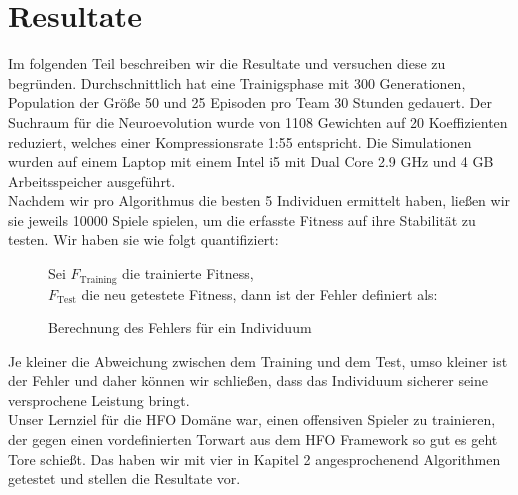 \newpage

\chapter{Resultate}
    Im folgenden Teil beschreiben wir die Resultate und versuchen diese zu begründen. Durchschnittlich hat eine Trainigsphase mit 300 Generationen, Population der Größe 50 und 25 Episoden pro Team 30 Stunden gedauert. Der Suchraum für die Neuroevolution wurde von 1108 Gewichten auf 20 Koeffizienten reduziert, welches einer Kompressionsrate 1:55 entspricht. Die Simulationen wurden auf einem Laptop mit einem Intel i5 mit Dual Core 2.9 GHz und 4 GB Arbeitsspeicher ausgeführt.\\[2mm]
    \noindent
    Nachdem wir pro Algorithmus die besten 5 Individuen ermittelt haben, ließen wir sie jeweils 10000 Spiele spielen, um die erfasste Fitness auf ihre Stabilität zu testen. Wir haben sie wie folgt quantifiziert:\\[2mm]

        \begin{figure}[H]
            \begin{mdframed}
                Sei $F_{\text{Training}}$ die trainierte Fitness, \\
                \hspace*{4mm} $F_{\text{Test}}$ die neu getestete Fitness, dann ist der Fehler definiert als:\\[4mm]
                \hspace*{40mm} 
            \end{mdframed}
            \renewcommand{\figurename}{Definition}
            \caption{Berechnung des Fehlers für ein Individuum}
        \end{figure}

        \noindent
        Je kleiner die Abweichung zwischen dem Training und dem Test, umso kleiner ist der Fehler und daher können wir schließen, dass das Individuum sicherer seine versprochene Leistung bringt.\\

        \noindent
        Unser Lernziel für die HFO Domäne war, einen offensiven Spieler zu trainieren, der gegen einen vordefinierten Torwart aus dem HFO Framework so gut es geht Tore schießt. Das haben wir mit vier in Kapitel 2 angesprochenend Algorithmen getestet und stellen die Resultate vor. \\[2mm]

